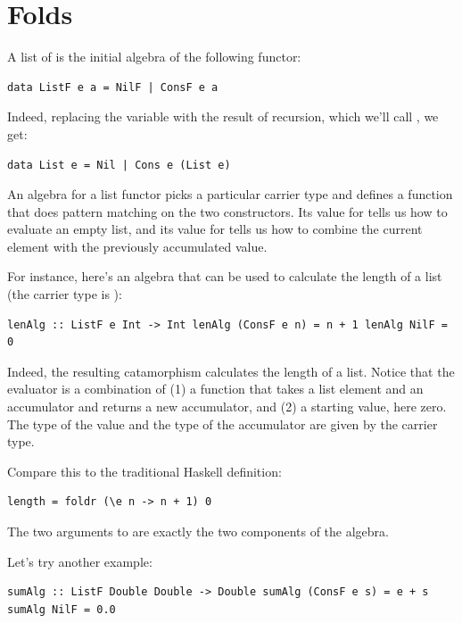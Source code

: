 \section{Folds}\label{folds}

A list of  is the initial algebra of the following functor:

\begin{verbatim}
data ListF e a = NilF | ConsF e a
\end{verbatim}

Indeed, replacing the variable  with the result of recursion,
which we'll call , we get:

\begin{verbatim}
data List e = Nil | Cons e (List e)
\end{verbatim}

An algebra for a list functor picks a particular carrier type and
defines a function that does pattern matching on the two constructors.
Its value for  tells us how to evaluate an empty list, and
its value for  tells us how to combine the current element
with the previously accumulated value.

For instance, here's an algebra that can be used to calculate the length
of a list (the carrier type is ):

\begin{verbatim}
lenAlg :: ListF e Int -> Int lenAlg (ConsF e n) = n + 1 lenAlg NilF = 0
\end{verbatim}

Indeed, the resulting catamorphism  calculates the
length of a list. Notice that the evaluator is a combination of (1) a
function that takes a list element and an accumulator and returns a new
accumulator, and (2) a starting value, here zero. The type of the value
and the type of the accumulator are given by the carrier type.

Compare this to the traditional Haskell definition:

\begin{verbatim}
length = foldr (\e n -> n + 1) 0
\end{verbatim}

The two arguments to  are exactly the two components of
the algebra.

Let's try another example:

\begin{verbatim}
sumAlg :: ListF Double Double -> Double sumAlg (ConsF e s) = e + s sumAlg NilF = 0.0
\end{verbatim}

